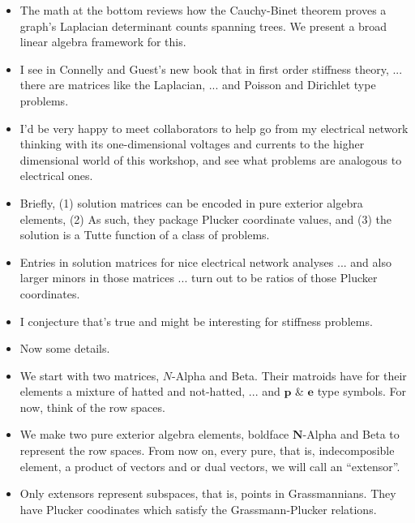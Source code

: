 \documentclass[14pt]{extarticle}
\begin{document}
{\bf
  \begin{itemize}

  \item The math at the bottom reviews how the Cauchy-Binet theorem proves a graph's Laplacian
    determinant counts spanning trees.  We present a broad linear algebra framework for this. 

  \item I see in Connelly and Guest's new book that
    in first order stiffness theory, ... there are matrices like the Laplacian, ...
      and Poisson and Dirichlet type problems.

  \item I'd be very happy to meet collaborators to help go from my electrical network
    thinking with its one-dimensional voltages and currents to the higher dimensional
    world of this workshop, and see what problems are analogous to electrical ones.

  \item Briefly,  (1) solution matrices can be encoded in pure exterior algebra elements, (2) As such,
    they package Plucker coordinate values, and (3) the solution is a Tutte function of a class
    of problems.

  \item
    Entries in solution matrices for nice electrical network analyses ... and also larger minors
    in those matrices ... turn out to be ratios of those Plucker coordinates. 

    \item I conjecture that's true and might be interesting for stiffness problems.
    
  \item Now some details.
      
  \item We start with two matrices, $N$-Alpha and Beta.  Their matroids
    have for their elements a mixture of hatted and not-hatted, ... and $\mathbf{p}$ \& $\mathbf{e}$ type
    symbols.
   For now, think of the row spaces.

  \item We make two pure exterior algebra elements,  boldface
    $\mathbf{N}$-Alpha and Beta to represent the row spaces.  From now on, every pure, that is,
    indecomposible element, 
    a product of vectors and or dual vectors, we will call an ``extensor''.  


    \item Only extensors represent subspaces, that is, points in Grassmannians.
      They have Plucker coodinates which satisfy the Grassmann-Plucker relations.


\end{itemize}}
\end{document}
